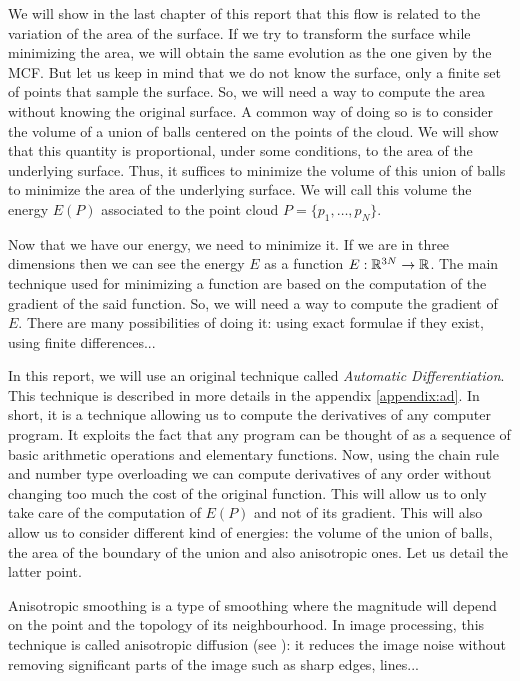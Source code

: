 We will show in the last chapter of this report that this flow is related to the
variation of the area of the surface. If we try to transform the surface while
minimizing the area, we will obtain the same evolution as the one given by the
MCF. But let us keep in mind that we do not know the surface, only a finite set
of points that sample the surface. So, we will need a way to compute the area
without knowing the original surface. A common way of doing so is to consider
the volume of a union of balls centered on the points of the cloud.  We will
show that this quantity is proportional, under some conditions, to the area of
the underlying surface. Thus, it suffices to minimize the volume of this union
of balls to minimize the area of the underlying surface. We will call this
volume the energy $ E(P) $ associated to the point cloud $ P = \{ p_1, \ldots,
p_N \} $.

Now that we have our energy, we need to minimize it. If we are in
three dimensions then we can see the energy $ E $ as a function $ E : \mathbb{R}^{3N}
\to \mathbb{R} $. The main technique used for minimizing a function are based on the
computation of the gradient of the said function. So, we will need a way to
compute the gradient of $ E $. There are many possibilities of doing it:
using exact formulae if they exist, using finite differences...

In this report, we will use an original technique called \textit{Automatic
    Differentiation}. This technique is described in more details in the
appendix \ref{appendix:ad}. In short, it is a technique allowing us to compute
the derivatives of any computer program. It exploits the fact that any program
can be thought of as a sequence of basic arithmetic operations and elementary
functions. Now, using the chain rule and number type overloading we can compute
derivatives of any order without changing too much the cost of the original
function.  This will allow us to only take care of the computation of $ E(P) $
and not of its gradient. This will also allow us to consider different kind of
energies: the volume of the union of balls, the area of the boundary of the
union and also anisotropic ones. Let us detail the latter point.

Anisotropic smoothing is a type of smoothing where the magnitude will depend on
the point and the topology of its neighbourhood. In image processing, this
technique is called anisotropic diffusion (see \cite{weickert1998anisotropic}):
it reduces the image noise without removing significant parts of the image such
as sharp edges, lines...

